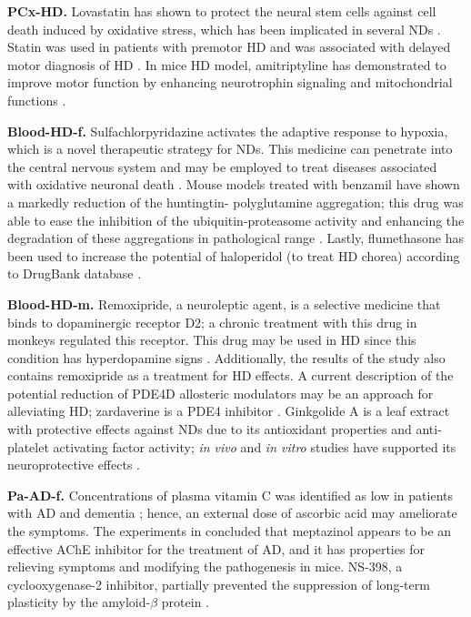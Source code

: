 \textbf{PCx-HD.} Lovastatin has shown to protect the neural stem cells against cell death induced by oxidative stress, which has been implicated in several NDs \cite{abdanipour}. Statin was used in patients with premotor HD and was associated with delayed motor diagnosis of HD \cite{schultz}. In mice HD model, amitriptyline has demonstrated to improve motor function by enhancing neurotrophin signaling and mitochondrial functions \cite{cong}.

\textbf{Blood-HD-f.} Sulfachlorpyridazine activates the adaptive response to hypoxia, which is a novel therapeutic strategy for NDs. This medicine can penetrate into the central nervous system and may be employed to treat diseases associated with oxidative neuronal death \cite{aleyasin}. Mouse models treated with benzamil have shown a markedly reduction of the huntingtin- polyglutamine aggregation; this drug was able to ease the inhibition of the ubiquitin-proteasome activity and enhancing the degradation of these aggregations in pathological range \cite{wong}. Lastly, flumethasone has been used to increase the potential of haloperidol (to treat HD chorea) according to DrugBank database \cite{wishart}.

\textbf{Blood-HD-m.} Remoxipride, a neuroleptic agent, is a selective medicine that binds to dopaminergic receptor D2; a chronic treatment with this drug in monkeys regulated this receptor. This drug may be used in HD since this condition has hyperdopamine signs \cite{lidow}. Additionally, the results of the study \cite{hu} also contains remoxipride as a treatment for HD effects. A current description of the potential reduction of PDE4D allosteric modulators may be an approach for alleviating HD; zardaverine is a PDE4 inhibitor \cite{azevedo}. Ginkgolide A is a leaf extract with protective effects against NDs due to its antioxidant properties and anti-platelet activating factor activity; \textit{in vivo} and \textit{in vitro} studies have supported its neuroprotective effects \cite{choudhary}.

\textbf{Pa-AD-f.} Concentrations of plasma vitamin C was identified as low in patients with AD and dementia \cite{dasilva}; hence, an external dose of ascorbic acid may ameliorate the symptoms. The experiments in \cite{shi} concluded that meptazinol appears to be an effective AChE inhibitor for the treatment of AD, and it has properties for relieving symptoms and modifying the pathogenesis in mice. NS-398, a cyclooxygenase-2 inhibitor, partially prevented the suppression of long-term plasticity by the amyloid-$\beta$ protein \cite{kotilinek}.

